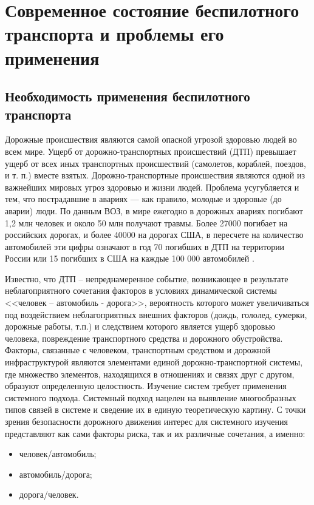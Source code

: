 \chapter{Современное состояние беспилотного транспорта и проблемы его применения} \label{chapt2}

\section{Необходимость применения беспилотного транспорта} \label{sect_Need}

Дорожные происшествия являются самой опасной
угрозой здоровью людей во всем мире. Ущерб от до­рожно­-транспортных 
происшествий (ДТП) превышает
ущерб от всех иных транспортных происшествий (само­летов,
кораблей, поездов, и т. п.) вместе взятых. До­рожно-­транспортные
происшествия являются одной из
важнейших мировых угроз здоровью и жизни людей.
Проблема усугубляется и тем, что пострадавшие в ава­риях — как правило, 
молодые и здоровые (до аварии)
люди. По данным ВОЗ, в мире ежегодно в дорожных
авариях погибают 1,2 млн человек и около 50 млн по­лучают 
травмы. Более 27000 погибает на российских
дорогах, и более 40000 на дорогах США, в пересчете
на количество автомобилей эти цифры означают в год
70 погибших в ДТП на территории России или 15 по­гибших 
в США на каждые 100 000 автомобилей \cite{DTP_ukr}.

Известно, что ДТП – непреднамеренное событие, возникающее в результате 
неблагоприятного сочетания факторов в
условиях динамической системы <<человек – автомобиль - дорога>>, вероятность 
которого может увеличиваться под
воздействием неблагоприятных внешних факторов (дождь, гололед, сумерки, дорожные 
работы, т.п.) и следствием
которого является ущерб здоровью человека, повреждение транспортного средства и 
дорожного обустройства.
Факторы, связанные с человеком, транспортным средством и дорожной 
инфраструктурой являются элементами единой
дорожно-транспортной системы, где множество элементов, находящихся в отношениях 
и связях друг с другом,
образуют определенную целостность. Изучение систем требует применения системного 
подхода. Системный подход
нацелен на выявление многообразных типов связей в системе и сведение их в единую 
теоретическую картину.
С точки зрения безопасности дорожного движения интерес для системного изучения 
представляют как сами факторы
риска, так и их различные сочетания, а именно:
\begin{itemize}
  \item человек/автомобиль;
  \item автомобиль/дорога;
  \item дорога/человек.
\end{itemize}

